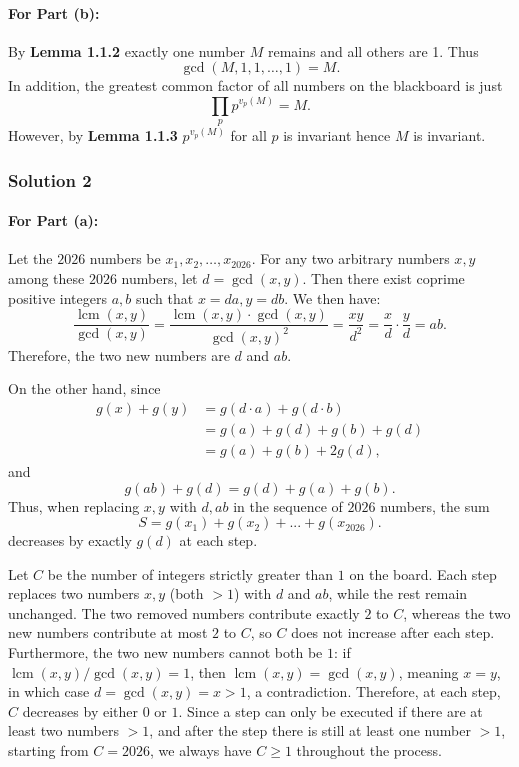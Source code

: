 \documentclass[11pt]{article}
\begin{document}
\paragraph{For Part (b):} By \textcolor{BrightAqua}{\textbf{Lemma 1.1.2}} exactly one number $M$ remains and all others are 1. Thus $$\gcd(M,1,1,\dots,1)=M.$$ In addition, the greatest common factor of all numbers on the blackboard is just $$\prod_{p} p^{v_{p}(M)} = M.$$ However, by \textcolor{BrightAqua}{\textbf{Lemma 1.1.3}} $p^{v_{p}(M)}$ for all $p$ is invariant hence $M$ is invariant. 

\subsubsection{Solution 2}
\paragraph{For Part (a):} Let the $2026$ numbers be $x_1, x_2, \dots, x_{2026}$. For any two arbitrary numbers $x, y$ among these $2026$ numbers, let $d=\gcd(x,y)$. Then there exist coprime positive integers $a, b$ such that $x=da, y=db$. We then have:
$$\dfrac{\operatorname{lcm}(x,y)}{\gcd(x,y)}=\dfrac{\operatorname{lcm}(x,y) \cdot \gcd(x,y)}{\gcd(x,y)^2}=\dfrac{xy}{d^2}=\dfrac{x}{d} \cdot \dfrac{y}{d}=ab.$$Therefore, the two new numbers are $d$ and $ab$.

\medskip
On the other hand, since 
\begin{align*}
g(x)+g(y)&=g(d \cdot a)+g(d \cdot b)\\&=g(a)+g(d)+g(b)+g(d)\\&=g(a)+g(b)+2g(d),
\end{align*}
and $$g(ab)+g(d)=g(d)+g(a)+g(b).$$Thus, when replacing $x, y$ with $d, ab$ in the sequence of $2026$ numbers, the sum $$S=g(x_1)+g(x_2)+...+g(x_{2026}).$$ decreases by exactly $g(d)$ at each step.

\medskip
Let $C$ be the number of integers strictly greater than $1$ on the board. Each step replaces two numbers $x, y$ (both $>1$) with $d$ and $ab$, while the rest remain unchanged. The two removed numbers contribute exactly $2$ to $C$, whereas the two new numbers contribute at most $2$ to $C$, so $C$ does not increase after each step. Furthermore, the two new numbers cannot both be $1$: if $\operatorname{lcm}(x,y)/\gcd(x,y)=1$, then $\operatorname{lcm}(x,y)=\gcd(x,y)$, meaning $x=y$, in which case $d=\gcd(x,y)=x>1$, a contradiction. Therefore, at each step, $C$ decreases by either $0$ or $1$. Since a step can only be executed if there are at least two numbers $>1$, and after the step there is still at least one number $>1$, starting from $C=2026$, we always have $C\ge 1$ throughout the process.
\end{document}
